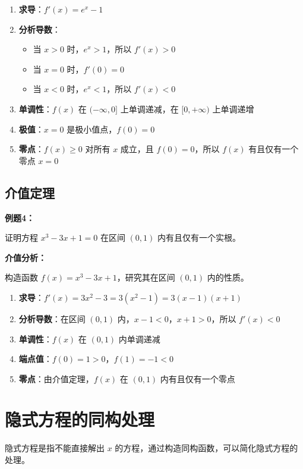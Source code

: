 \documentclass[a4paper,11pt]{ctexrep}
\newcommand{\exampleicon}{\ModeBadge[highlight]{例题}}
\newcommand{\analysisicon}{\ModeBadge[secondary]{分析}}
\theoremstyle{definition}
\begin{document}
\begin{enumerate}
    \item \textbf{求导}：$f'(x) = e^x - 1$
    \item \textbf{分析导数}：
    \begin{itemize}
        \item 当 $x > 0$ 时，$e^x > 1$，所以 $f'(x) > 0$
        \item 当 $x = 0$ 时，$f'(0) = 0$
        \item 当 $x < 0$ 时，$e^x < 1$，所以 $f'(x) < 0$
    \end{itemize}
    \item \textbf{单调性}：$f(x)$ 在 $(-\infty, 0]$ 上单调递减，在 $[0, +\infty)$ 上单调递增
    \item \textbf{极值}：$x = 0$ 是极小值点，$f(0) = 0$
    \item \textbf{零点}：$f(x) \geq 0$ 对所有 $x$ 成立，且 $f(0) = 0$，所以 $f(x)$ 有且仅有一个零点 $x = 0$
\end{enumerate}

\subsection{介值定理}

\exampleicon \textbf{例题4：}

证明方程 $x^3 - 3x + 1 = 0$ 在区间 $(0, 1)$ 内有且仅有一个实根。

\analysisicon \textbf{介值分析：}

构造函数 $f(x) = x^3 - 3x + 1$，研究其在区间 $(0, 1)$ 内的性质。

\begin{enumerate}
    \item \textbf{求导}：$f'(x) = 3x^2 - 3 = 3(x^2 - 1) = 3(x-1)(x+1)$
    \item \textbf{分析导数}：在区间 $(0, 1)$ 内，$x-1 < 0$，$x+1 > 0$，所以 $f'(x) < 0$
    \item \textbf{单调性}：$f(x)$ 在 $(0, 1)$ 内单调递减
    \item \textbf{端点值}：$f(0) = 1 > 0$，$f(1) = -1 < 0$
    \item \textbf{零点}：由介值定理，$f(x)$ 在 $(0, 1)$ 内有且仅有一个零点
\end{enumerate}

\section{隐式方程的同构处理}

隐式方程是指不能直接解出 $x$ 的方程，通过构造同构函数，可以简化隐式方程的处理。
\end{document}
